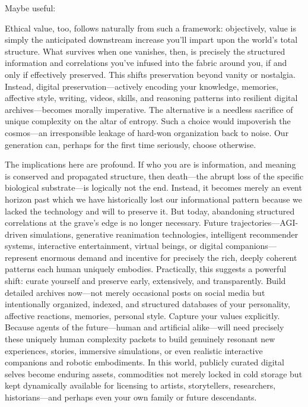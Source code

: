 \begin{itemize}
    Maybe useful:
    
    Ethical value, too, follows naturally from such a framework: objectively, value is simply the anticipated downstream increase you'll impart upon the world's total structure. What survives when one vanishes, then, is precisely the structured information and correlations you've infused into the fabric around you, if and only if effectively preserved. This shifts preservation beyond vanity or nostalgia. Instead, digital preservation---actively encoding your knowledge, memories, affective style, writing, videos, skills, and reasoning patterns into resilient digital archives---becomes morally imperative. The alternative is a needless sacrifice of unique complexity on the altar of entropy. Such a choice would impoverish the cosmos---an irresponsible leakage of hard-won organization back to noise. Our generation can, perhaps for the first time seriously, choose otherwise. 

    The implications here are profound. If who you are is information, and meaning is conserved and propagated structure, then death---the abrupt loss of the specific biological substrate---is logically not the end. Instead, it becomes merely an event horizon past which we have historically lost our informational pattern because we lacked the technology and will to preserve it. But today, abandoning structured correlations at the grave's edge is no longer necessary. Future trajectories---AGI-driven simulations, generative reanimation technologies, intelligent recommender systems, interactive entertainment, virtual beings, or digital companions---represent enormous demand and incentive for precisely the rich, deeply coherent patterns each human uniquely embodies. Practically, this suggests a powerful shift: curate yourself and preserve early, extensively, and transparently. Build detailed archives now---not merely occasional posts on social media but intentionally organized, indexed, and structured databases of your personality, affective reactions, memories, personal style. Capture your values explicitly. Because agents of the future---human and artificial alike---will need precisely these uniquely human complexity packets to build genuinely resonant new experiences, stories, immersive simulations, or even realistic interactive companions and robotic embodiments. In this world, publicly curated digital selves become enduring assets, commodities not merely locked in cold storage but kept dynamically available for licensing to artists, storytellers, researchers, historians---and perhaps even your own family or future descendants.


\end{itemize}
